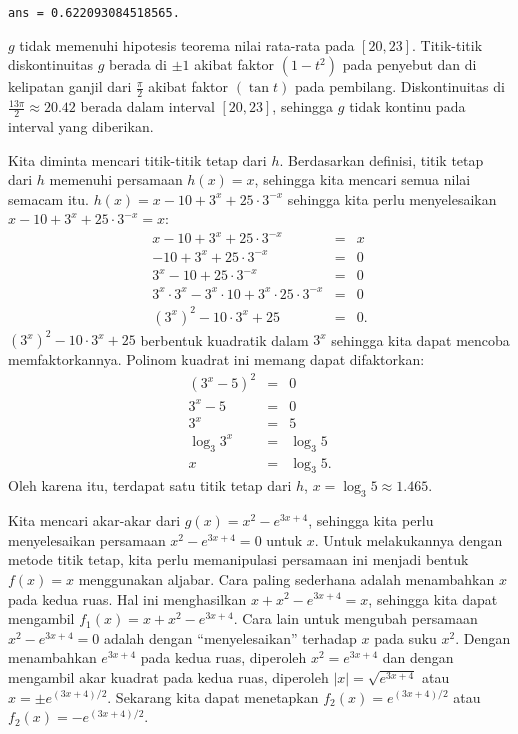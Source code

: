 \begin{description}
\begin{center}
\texttt{ans = 0.622093084518565.}
\par\end{center}
\item [{\ref{exc:fixedpt-1}:}] $g$ tidak memenuhi hipotesis teorema nilai
rata-rata pada $[20,23]$. Titik-titik diskontinuitas $g$ berada
di $\pm1$ akibat faktor $(1-t^{2})$ pada penyebut dan di kelipatan
ganjil dari $\frac{\pi}{2}$ akibat faktor $(\tan t)$ pada pembilang.
Diskontinuitas di $\frac{13\pi}{2}\approx20.42$ berada dalam interval
$[20,23]$, sehingga $g$ tidak kontinu pada interval yang diberikan.
\item [{\ref{exc:fixedpt-6}:}] Kita diminta mencari titik-titik tetap
dari $h$. Berdasarkan definisi, titik tetap dari $h$ memenuhi persamaan
$h(x)=x$, sehingga kita mencari semua nilai semacam itu. $h(x)=x-10+3^{x}+25\cdot3^{-x}$
sehingga kita perlu menyelesaikan $x-10+3^{x}+25\cdot3^{-x}=x$:
\begin{eqnarray*}
x-10+3^{x}+25\cdot3^{-x} & = & x\\
-10+3^{x}+25\cdot3^{-x} & = & 0\\
3^{x}-10+25\cdot3^{-x} & = & 0\\
3^{x}\cdot3^{x}-3^{x}\cdot10+3^{x}\cdot25\cdot3^{-x} & = & 0\\
(3^{x})^{2}-10\cdot3^{x}+25 & = & 0.
\end{eqnarray*}
$(3^{x})^{2}-10\cdot3^{x}+25$ berbentuk kuadratik dalam $3^{x}$
sehingga kita dapat mencoba memfaktorkannya. Polinom kuadrat ini memang
dapat difaktorkan:
\begin{eqnarray*}
(3^{x}-5)^{2} & = & 0\\
3^{x}-5 & = & 0\\
3^{x} & = & 5\\
\log_{3}3^{x} & = & \log_{3}5\\
x & = & \log_{3}5.
\end{eqnarray*}
Oleh karena itu, terdapat satu titik tetap dari $h$, $x=\log_{3}5\approx1.465$.
\item [{\ref{exc:fixedpt-8}:}] Kita mencari akar-akar dari $g(x)=x^{2}-e^{3x+4}$,
sehingga kita perlu menyelesaikan persamaan $x^{2}-e^{3x+4}=0$ untuk
$x$. Untuk melakukannya dengan metode titik tetap, kita perlu memanipulasi
persamaan ini menjadi bentuk $f(x)=x$ menggunakan aljabar. Cara paling
sederhana adalah menambahkan $x$ pada kedua ruas. Hal ini menghasilkan
$x+x^{2}-e^{3x+4}=x$, sehingga kita dapat mengambil $f_{1}(x)=x+x^{2}-e^{3x+4}$.
Cara lain untuk mengubah persamaan $x^{2}-e^{3x+4}=0$ adalah dengan
``menyelesaikan'' terhadap $x$ pada suku $x^{2}$. Dengan menambahkan
$e^{3x+4}$ pada kedua ruas, diperoleh $x^{2}=e^{3x+4}$ dan dengan
mengambil akar kuadrat pada kedua ruas, diperoleh $|x|=\sqrt{e^{3x+4}}$
atau $x=\pm e^{(3x+4)/2}$. Sekarang kita dapat menetapkan $f_{2}(x)=e^{(3x+4)/2}$
atau $f_{2}(x)=-e^{(3x+4)/2}$.


\end{description}
